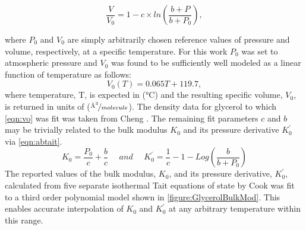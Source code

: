 \begin{equation} 
\frac{V}{V_0}=1-c\times ln\left(\frac{b+P}{b+P_0}\right),
\label{eqn:tait}
\end{equation}

\noindent where $P_0$ and $V_0$ are simply arbitrarily chosen reference values of pressure and volume, respectively, at a specific temperature.  For this work $P_0$ was set to atmospheric pressure and $V_0$ was found to be sufficiently well modeled as a linear function of temperature as follows:
\begin{equation}
V_0(T)=0.065T + 119.7,
\label{eqn:vo}
\end{equation} 
where temperature, T, is expected in ($\si{\degreeCelsius}$) and the resulting specific volume, $V_0$, is returned in units of ($\nicefrac{\si{\angstrom\cubed}}{molecule}$).  The density data for glycerol to which \eqn \ref{eqn:vo} was fit was taken from Cheng \nolinebreak\cite{Cheng}. The remaining fit parameters $c$ and $b$ may be trivially related to the bulk modulus $K_0$ and its pressure derivative $K_{0}^{'}$ via \eqn \ref{eqn:abtait}.   
\begin{equation} 
K_0=\frac{P_0}{c}+\frac{b}{c}\:\:\:\:\:\:
and\:\:\:\:\:\:
K_{0}^{'}=\frac{1}{c}-1-Log\left ( \frac{b}{b+P_0} \right )
\label{eqn:abtait}
\end{equation} 
The reported values of the bulk modulus, $K_0$, and its pressure derivative, $K_{0}^{'}$, calculated from five separate isothermal Tait equations of state by Cook \etal was fit to a third order polynomial model shown in \fig \ref{figure:GlycerolBulkMod}.  This enables accurate interpolation of $K_0$ and $K_{0}^{'}$ at any arbitrary temperature within this range.
